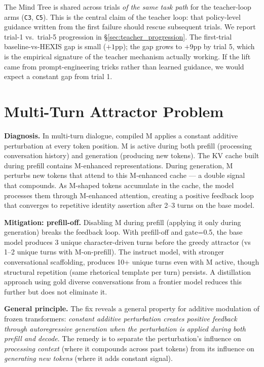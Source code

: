 \begin{description}[leftmargin=*]
\item[\textbf{Q10. Why does the Mind Tree retain state across trials? Isn't that within-task overfitting?}] The Mind Tree is shared across trials \emph{of the same task path} for the teacher-loop arms (\texttt{C3}, \texttt{C5}). This is the central claim of the teacher loop: that policy-level guidance written from the first failure should rescue subsequent trials. We report trial-1 vs.\ trial-5 progression in \S\ref{sec:teacher_progression}. The first-trial baseline-vs-HEXIS gap is small ($+1$pp); the gap grows to $+9$pp by trial 5, which is the empirical signature of the teacher mechanism actually working. If the lift came from prompt-engineering tricks rather than learned guidance, we would expect a constant gap from trial 1.

\end{description}

\section{Multi-Turn Attractor Problem}
\label{sec:attractor}

\textbf{Diagnosis.} In multi-turn dialogue, compiled M applies a constant additive perturbation at every token position. M is active during both prefill (processing conversation history) and generation (producing new tokens). The KV cache built during prefill contains M-enhanced representations. During generation, M perturbs new tokens that attend to this M-enhanced cache --- a double signal that compounds. As M-shaped tokens accumulate in the cache, the model processes them through M-enhanced attention, creating a positive feedback loop that converges to repetitive identity assertion after 2--3 turns on the base model.

\textbf{Mitigation: prefill-off.} Disabling M during prefill (applying it only during generation) breaks the feedback loop. With prefill-off and gate=0.5, the base model produces 3 unique character-driven turns before the greedy attractor (vs 1--2 unique turns with M-on-prefill). The instruct model, with stronger conversational scaffolding, produces 10+ unique turns even with M active, though structural repetition (same rhetorical template per turn) persists. A distillation approach using gold diverse conversations from a frontier model reduces this further but does not eliminate it.

\textbf{General principle.} The fix reveals a general property for additive modulation of frozen transformers: \emph{constant additive perturbation creates positive feedback through autoregressive generation when the perturbation is applied during both prefill and decode}. The remedy is to separate the perturbation's influence on \emph{processing context} (where it compounds across past tokens) from its influence on \emph{generating new tokens} (where it adds constant signal).

